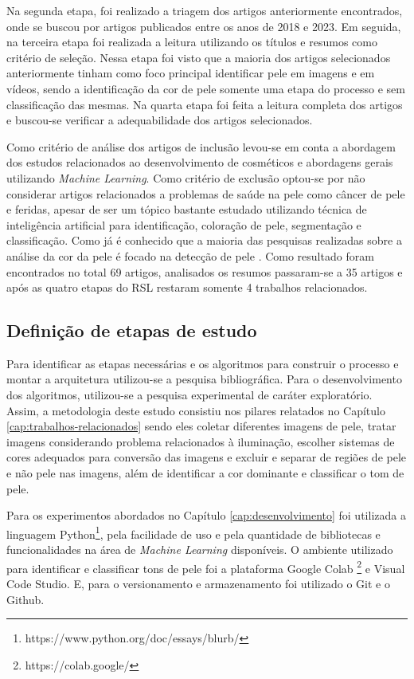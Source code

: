 Na segunda etapa, foi realizado a triagem dos artigos anteriormente encontrados, onde se buscou por artigos publicados entre os anos de 2018 e 2023. Em seguida, na terceira etapa foi realizada a leitura utilizando os títulos e resumos como critério de seleção. Nessa etapa foi visto que a maioria dos artigos selecionados anteriormente tinham como foco principal identificar pele em imagens e em vídeos, sendo a identificação da cor de pele somente uma etapa do processo e sem classificação das mesmas. Na quarta etapa foi feita a leitura completa dos artigos e buscou-se verificar a adequabilidade dos artigos selecionados. 

Como critério de análise dos artigos de inclusão levou-se em conta a abordagem dos estudos relacionados ao desenvolvimento de cosméticos e abordagens gerais utilizando \textit{Machine Learning}. Como critério de exclusão optou-se por não considerar artigos relacionados a problemas de saúde na pele como câncer de pele e feridas, apesar de ser um tópico bastante estudado utilizando técnica de inteligência artificial para identificação, coloração de pele, segmentação e classificação. Como já é conhecido que a maioria das pesquisas realizadas sobre a análise da cor da pele é focado na detecção de pele \cite{A_survey_of_skin-color_modeling_and_detection_methods}. Como resultado foram encontrados no total 69 artigos, analisados os resumos passaram-se a 35 artigos e após as quatro etapas do RSL restaram somente 4 trabalhos relacionados.

\subsection{Definição de etapas de estudo}
Para identificar as etapas necessárias e os algoritmos para construir o processo e montar a arquitetura utilizou-se a pesquisa bibliográfica. Para o desenvolvimento dos algoritmos, utilizou-se a pesquisa experimental de caráter exploratório. Assim, a metodologia deste estudo consistiu nos pilares relatados no Capítulo \ref{cap:trabalhos-relacionados} sendo eles coletar diferentes imagens de pele, tratar imagens considerando problema relacionados à iluminação, escolher sistemas de cores adequados para conversão das imagens e excluir e separar de regiões de pele e não pele nas imagens, além de identificar a cor dominante e classificar o tom de pele.

Para os experimentos abordados no Capítulo \ref{cap:desenvolvimento} foi utilizada a linguagem Python\footnote{https://www.python.org/doc/essays/blurb/}, pela facilidade de uso e pela quantidade de bibliotecas e funcionalidades na área de \textit{Machine Learning} disponíveis. O ambiente utilizado para identificar e classificar tons de pele foi a plataforma Google Colab \footnote{https://colab.google/} e Visual Code Studio. E, para o versionamento e armazenamento foi utilizado o Git e o Github.

